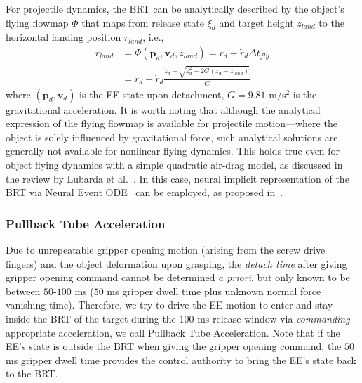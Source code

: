 \documentclass[letterpaper, 10 pt, conference]{ieeeconf} %
\begin{document}
For projectile dynamics, the BRT can be analytically described by the object's flying flowmap $\Phi$ that maps from release state $\xi_d$ and target height $z_{land}$ to the horizontal landing position $r_{land}$, i.e.,
\begin{align*}
   r_{land} &=  \Phi(\bm{p}_d, \bm{v}_d, z_{land}) = r_d+\dot{r}_d\Delta t_{fly} \\
&=r_d+\dot{r}_d\frac{\dot{z}_d+\sqrt{\dot{z}_d^2+2G(z_d-z_{land})}}{G}
\end{align*}
where $(\bm{p}_d, \bm{v}_d)$ is the EE state upon detachment, $G = 9.81 \text{ m}/\text{s}^2$ is the gravitational acceleration. 
It is worth noting that although the analytical expression of the flying flowmap is available for projectile motion—where the object is solely influenced by gravitational force, such analytical solutions are generally not available for nonlinear flying dynamics. This holds true even for object flying dynamics with a simple quadratic air-drag model, as discussed in the review by Lubarda et al.~\cite{lubarda2022review}. In this case, neural implicit representation of the BRT via Neural Event ODE~\cite{chen2021learning} can be employed, as proposed in~\cite{liu2024tube}.

\subsubsection{Pullback Tube Acceleration}
Due to unrepeatable gripper opening motion (arising from the screw drive fingers) and the object deformation upon grasping, the \emph{detach time} after giving gripper opening command cannot be determined \emph{a priori}, but only known to be between $50$-$100$ ms ($50$ ms gripper dwell time plus unknown normal force vanishing time). Therefore, we try to drive the EE motion to enter and stay inside the BRT of the target during the $100$ ms release window via \emph{commanding} appropriate acceleration, we call Pullback Tube Acceleration. Note that if the EE's state is outside the BRT when giving the gripper opening command, the $50$ms gripper dwell time provides the control authority to bring the EE's state back to the BRT.  
\end{document}
